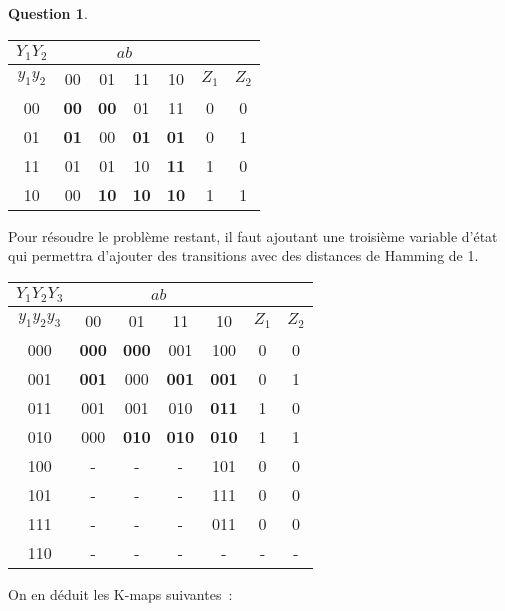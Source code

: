 \documentclass[11pt,a4paper]{article}
\theoremstyle{definition}%
\newtheorem{Q}{Question}[] %
\begin{document}
\begin{Q}
{	\begin{center}
		\begin{tabular}{|c|c|c|c|c|c|c|}\hline
		$Y_1Y_2$ & \multicolumn{4}{c|}{$ab$} & \multicolumn{2}{c|}{} \\ \hline
		$y_1y_2$ & 00 & 01 & 11 & 10 & $Z_1$ & $Z_2$ \\ \hline
		00 & \textbf{00} & \textbf{00} & 01 & {\color{red}11} & 0 & 0 \\ \hline
		01 & \textbf{01} & 00 & \textbf{01} & \textbf{01} & 0 & 1 \\ \hline
		11 & 01 & {\color{green}01} & 10 & \textbf{11} & 1 & 0 \\ \hline
		10 & 00 & \textbf{10} & \textbf{10} & \textbf{10} & 1 & 1 \\ \hline
		\end{tabular}
	\end{center}

	Pour résoudre le problème restant, il faut ajoutant une troisième variable d'état qui permettra d'ajouter des transitions avec des distances de Hamming de 1.

	\begin{center}
		\begin{tabular}{|c|c|c|c|c|c|c|}\hline
		$Y_1Y_2Y_3$ & \multicolumn{4}{c|}{$ab$} & \multicolumn{2}{c|}{} \\ \hline
		$y_1y_2y_3$ & 00 & 01 & 11 & 10 & $Z_1$ & $Z_2$ \\ \hline
		000 & \textbf{000} & \textbf{000} & 001 & {\color{green}100} & 0 & 0 \\ \hline
		001 & \textbf{001} & 000 & \textbf{001} & \textbf{001} & 0 & 1 \\ \hline
		011 & 001 & 001 & 010 & \textbf{011} & 1 & 0 \\ \hline
		010 & 000 & \textbf{010} & \textbf{010} & \textbf{010} & 1 & 1 \\ \hline
		100 & - & - & - & 101 & 0 & 0 \\ \hline
		101 & - & - & - & 111 & 0 & 0 \\ \hline
		111 & - & - & - & 011 & 0 & 0 \\ \hline
		110 & - & - & - & - & - & - \\ \hline
		\end{tabular}
	\end{center}

	On en déduit les K-maps suivantes~:
	\begin{center}
	\end{center}

}
\end{Q}
\end{document}

